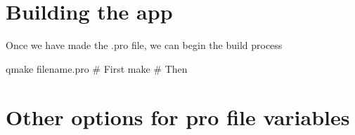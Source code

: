 \documentclass{report}
\begin{document}
    \bigbreak \noindent 
    \section*{Building the app}
    \bigbreak \noindent 
    Once we have made the .pro file, we can begin the build process
    \bigbreak \noindent 
    \begin{bashcode}
qmake filename.pro # First
make # Then
    \end{bashcode}

    \pagebreak \bigbreak \noindent 
    \section*{Other options for pro file variables}
\end{document}
